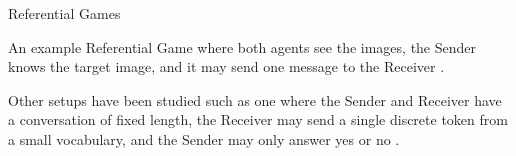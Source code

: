 \documentclass[final]{beamer}
\newlength{\onecolwid}
\begin{document}
\begin{frame}[t]
\begin{columns}[t]
\begin{column}{\onecolwid}
\begin{block}{Referential Games}
\vspace{5mm}

An example Referential Game where both agents see the images, the Sender knows the target image, and it may send one message to the Receiver \cite{Lazaridou:2017multi}.

\vspace{5mm}

Other setups have been studied such as one where the Sender and Receiver have a conversation of fixed length, the Receiver may send a single discrete token from a small vocabulary, and the Sender may only answer yes or no \cite{Jorge:2016learning}.

\end{block}

\vspace{5mm}




  
  





\end{column}
\end{columns}
\end{frame}
\end{document}
